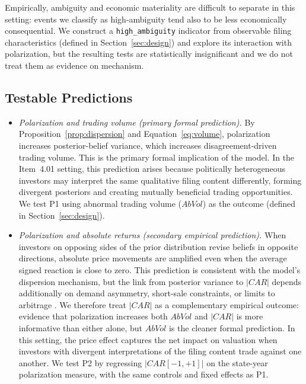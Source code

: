 \documentclass[12pt]{article}
\begin{document}
Empirically, ambiguity and economic materiality are difficult to
separate in this setting: events we classify as high-ambiguity tend
also to be less economically consequential. We construct a
\texttt{high\_ambiguity} indicator from observable filing
characteristics (defined in Section~\ref{sec:design}) and explore its
interaction with polarization, but the resulting tests are
statistically insignificant and we do not treat them as evidence on
mechanism.

\subsection{Testable Predictions}

\begin{itemize}
    \item[\textbf{P1.}] \textit{Polarization and trading volume (primary formal
    prediction).} By Proposition~\ref{prop:dispersion} and
    Equation~\eqref{eq:volume}, polarization increases posterior-belief
    variance, which increases disagreement-driven trading volume. This is
    the primary formal implication of the model. In the Item~4.01 setting,
    this prediction arises because politically heterogeneous investors
    may interpret the same qualitative filing content differently, forming
    divergent posteriors and creating mutually beneficial trading
    opportunities. We test P1 using abnormal
    trading volume ($AbVol$) as the outcome (defined in
    Section~\ref{sec:design}).

    \item[\textbf{P2.}] \textit{Polarization and absolute returns (secondary
    empirical prediction).} When investors on opposing sides of the prior
    distribution revise beliefs in opposite directions, absolute price
    movements are amplified even when the average signed reaction is close to
    zero. This prediction is consistent with the model's dispersion mechanism,
    but the link from posterior variance to $|CAR|$ depends additionally on
    demand asymmetry, short-sale constraints, or limits to arbitrage
    \citep{miller1977, hong2003, gromb2010}. We therefore treat $|CAR|$
    as a complementary empirical outcome: evidence that polarization increases
    both $AbVol$ and $|CAR|$ is more informative than either alone, but $AbVol$
    is the cleaner formal prediction. In this setting, the price effect
    captures the net impact on valuation when investors with divergent
    interpretations of the filing content trade against one another.
    We test P2 by regressing $|CAR[-1,+1]|$
    on the state-year polarization measure, with the same controls and fixed
    effects as P1.
\end{itemize}
\end{document}
